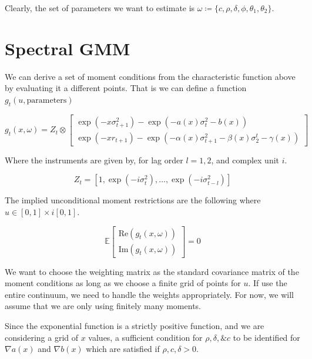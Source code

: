 \documentclass[11pt]{article}
\newcommand*{\E}{\mathbb{E}}
\begin{document}
Clearly, the set of parameters we want to estimate is $\omega \coloneqq \lbrace c, \rho, \delta, \phi, \theta_1,
\theta_2\rbrace$.

\section{Spectral GMM}

We can derive a set of moment conditions from the characteristic function above by evaluating it a different
points.
That is we can define a function $g_t(u, \text{parameters})$

\begin{equation}
g_t(x, \omega) = Z_t \otimes \begin{bmatrix} \exp(- x \sigma^2_{t+1}) - \exp\left( - a(x) \sigma_t^2 - b(x)
    \right) \\ \exp\left(- x r_{t+1}\right) - \exp\left(- \alpha(x) \sigma^2_{t+1} - \beta(x) \sigma_2^t -
    \gamma(x)\right) \end{bmatrix}
\end{equation}

Where the instruments are given by, for lag order $l = 1, 2$, and complex unit $i$. 

\begin{equation}
    Z_t = \left[1, \exp\left(- i \sigma_t^2\right), \ldots, \exp\left(-i \sigma^2_{t-l}\right)\right] 
\end{equation}

The implied unconditional moment restrictions are the following where $u \in [0,1] \times i [0,1]$.  

\begin{equation}
\E \begin{bmatrix}  \mathrm{Re} (g_t(x, \omega)) \\ \mathrm{Im} (g_t(x, \omega)) \end{bmatrix} = 0
\end{equation}


We want to choose the weighting matrix as the standard covariance matrix of the moment conditions as long as we
choose a finite grid of points for $u$.
If use the entire continuum, we need to handle the weights appropriately.
For now, we will assume that we are only using finitely many moments.

Since the exponential function is a strictly positive function, and we are considering a grid of $x$ values,
a sufficient condition for $\rho, \delta, \& c$ to be identified for $\nabla a(x)$ and $\nabla b(x)$ which are
satisfied if $\rho, c, \delta > 0$.
\end{document}
